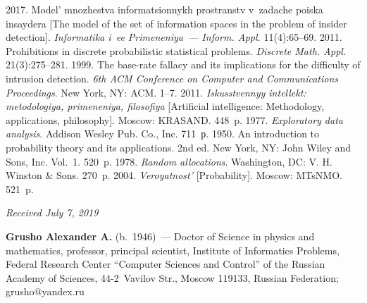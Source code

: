 \begin{multicols}{2}
{{\begin{thebibliography}{99}
 2017. Model' 
mnozhestva informatsionnykh prostranstv v~zadache poiska insaydera [The model of the set of 
information spaces in the problem of insider detection]. \textit{Informatika i~ee Primeneniya~--- 
Inform. Appl.} 11(4):65--69.
 2011. Prohibitions in discrete probabilistic statistical problems. 
\textit{Discrete Math. Appl.} 21(3):275--281.
 1999. The base-rate fallacy and its implications for the difficulty of intrusion 
detection. \textit{6th ACM Conference on Computer and Communications Proceedings}. 
New York, NY: ACM. 1--7.
 2011. \textit{Iskusstvennyy intellekt: metodologiya, primeneniya, filosofiya} 
[Artificial intelligence: Methodology, applications, philosophy]. Moscow: KRASAND. 448~p.
 1977. \textit{Exploratory data analysis}. Addison Wesley Pub. Co., Inc. 711~р.
 1950. An introduction to probability theory and its applications. 2nd ed. New York, 
NY: John Wiley and Sons, Inc. Vol.~1. 520~p.
 1978. \textit{Random allocations}. 
Washington, DC: V. H. Winston \& Sons. 270~p.
 2004. \textit{Veroyatnost'} [Probability]. Moscow: MTsNMO. 521~p.

\end{thebibliography}

 }
 }

\end{multicols}


\hfill{\small\textit{Received July 7, 2019}}



\Contr

\noindent
\textbf{Grusho Alexander A.} (b.\ 1946)~--- Doctor of Science in physics and 
mathematics, professor, principal scientist, Institute of Informatics Problems, Federal 
Research Center ``Computer Sciences and Control'' of the Russian Academy of 
Sciences, 44-2~Vavilov Str., Moscow 119133, Russian Federation; 
\mbox{grusho@yandex.ru} 

\vspace*{3pt}

